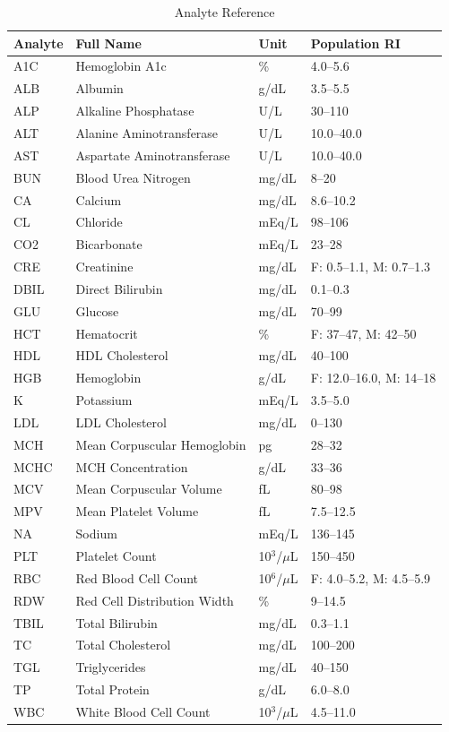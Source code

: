 \begin{table}[ht]
\centering
\footnotesize
\begin{tabular}{llll}
\toprule
Analyte & Full Name & Unit & Population RI \\
\midrule
A1C & Hemoglobin A1c & \% & 4.0--5.6 \\
ALB & Albumin & g/dL & 3.5--5.5 \\
ALP & Alkaline Phosphatase & U/L & 30--110 \\
ALT & Alanine Aminotransferase & U/L & 10.0--40.0 \\
AST & Aspartate Aminotransferase & U/L & 10.0--40.0 \\
BUN & Blood Urea Nitrogen & mg/dL & 8--20 \\
CA & Calcium & mg/dL & 8.6--10.2 \\
CL & Chloride & mEq/L & 98--106 \\
CO2 & Bicarbonate & mEq/L & 23--28 \\
CRE & Creatinine & mg/dL & F: 0.5--1.1, M: 0.7--1.3 \\
DBIL & Direct Bilirubin & mg/dL & 0.1--0.3 \\
GLU & Glucose & mg/dL & 70--99 \\
HCT & Hematocrit & \% & F: 37--47, M: 42--50 \\
HDL & HDL Cholesterol & mg/dL & 40--100 \\
HGB & Hemoglobin & g/dL & F: 12.0--16.0, M: 14--18 \\
K & Potassium & mEq/L & 3.5--5.0 \\
LDL & LDL Cholesterol & mg/dL & 0--130 \\
MCH & Mean Corpuscular Hemoglobin & pg & 28--32 \\
MCHC & MCH Concentration & g/dL & 33--36 \\
MCV & Mean Corpuscular Volume & fL & 80--98 \\
MPV & Mean Platelet Volume & fL & 7.5--12.5 \\
NA & Sodium & mEq/L & 136--145 \\
PLT & Platelet Count & 10$^3$/$\mu$L & 150--450 \\
RBC & Red Blood Cell Count & 10$^6$/$\mu$L & F: 4.0--5.2, M: 4.5--5.9 \\
RDW & Red Cell Distribution Width & \% & 9--14.5 \\
TBIL & Total Bilirubin & mg/dL & 0.3--1.1 \\
TC & Total Cholesterol & mg/dL & 100--200 \\
TGL & Triglycerides & mg/dL & 40--150 \\
TP & Total Protein & g/dL & 6.0--8.0 \\
WBC & White Blood Cell Count & 10$^3$/$\mu$L & 4.5--11.0 \\
\bottomrule
\end{tabular}
\caption{Analyte Reference}
\label{tab:analyte_reference}
\end{table}